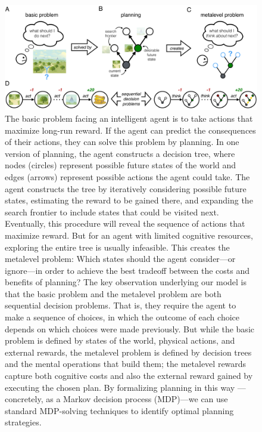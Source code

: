 \begin{figure}[ht]
    \centering
    \includegraphics[width=\textwidth]{figs/planning/fig1.pdf}
    \caption{
       The basic problem facing an intelligent agent is to take actions that maximize long-run reward. If the agent can predict the consequences of their actions, they can solve this problem by planning.
       In one version of planning, the agent constructs a decision tree, where nodes (circles) represent possible future states of the world and edges (arrows) represent possible actions the agent could take. The agent constructs the tree by iteratively considering possible future states, estimating the reward to be gained there, and expanding the search frontier to include states that could be visited next. 
      Eventually, this procedure will reveal the sequence of actions that maximize reward. But for an agent with limited cognitive resources, exploring the entire tree is usually infeasible. 
      This creates the metalevel problem:
       Which states should the agent consider---or ignore---in order to achieve the best tradeoff between the costs and benefits of planning?
       The key observation underlying our model is that the basic problem and the metalevel problem are both sequential decision problems. 
      That is, they require the agent to make a sequence of choices, in which the outcome of each choice depends on which choices were made previously. 
      But while the basic problem is defined by states of the world, physical actions, and external rewards, the metalevel problem is defined by decision trees and the mental operations that build them; the metalevel rewards capture both cognitive costs and also the external reward gained by executing the chosen plan. By formalizing planning in this way
      ---concretely, as a Markov decision process (MDP)---we can use standard MDP-solving techniques to identify optimal planning strategies.
    }
    \label{fig:planning-model}
\end{figure}

